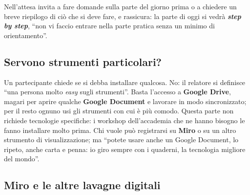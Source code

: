 Nell'attesa invita a fare domande sulla parte del giorno prima o a chiedere un
breve riepilogo di ciò che si deve fare, e rassicura: la parte di oggi si vedrà
\textbf{\emph{step by step}}, ``non vi faccio entrare nella parte pratica senza
un minimo di orientamento''.

\subsection{Servono strumenti particolari?}

Un partecipante chiede se si debba installare qualcosa. No: il relatore si
definisce ``una persona molto \emph{easy} sugli strumenti''. Basta l'accesso a
\textbf{Google Drive}, magari per aprire qualche \textbf{Google Document} e
lavorare in modo sincronizzato; per il resto ognuno usi gli strumenti con cui
è più comodo. Questa parte non richiede tecnologie specifiche: i workshop
dell'accademia che ne hanno bisogno le fanno installare molto prima. Chi vuole
può registrarsi su \textbf{Miro} o su un altro strumento di visualizzazione;
ma ``potete usare anche un Google Document, lo ripeto, anche carta e penna: io
giro sempre con i quaderni, la tecnologia migliore del mondo''.

\subsection{Miro e le altre lavagne digitali}
\label{z7:subsec:miro}

